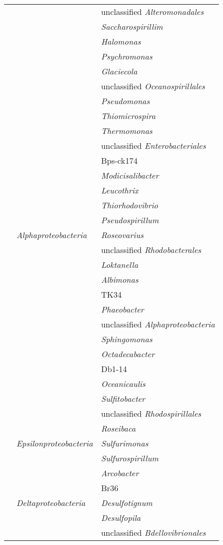 \begin{longtable}{p{2.5cm}p{4cm}p{7cm}}
 &  & unclassified \emph{Alteromonadales} \\
 &  & \emph{Saccharospirillim} \\
 &  & \emph{Halomonas} \\
 &  & \emph{Psychromonas} \\
 &  & \emph{Glaciecola} \\
 &  & unclassified \emph{Oceanospirillales} \\
 &  & \emph{Pseudomonas} \\
 &  & \emph{Thiomicrospira} \\
 &  & \emph{Thermomonas} \\
 &  & unclassified \emph{Enterobacteriales} \\
 &  & Bps-ck174  \\
 &  & \emph{Modicisalibacter} \\
 &  & \emph{Leucothrix} \\
 &  & \emph{Thiorhodovibrio} \\
 &  & \emph{Pseudospirillum} \\
 & \emph{Alphaproteobacteria}  & \emph{Roseovarius} \\
 &  & unclassified \emph{Rhodobacterales} \\
 &  & \emph{Loktanella} \\
 &  & \emph{Albimonas} \\
 &  & TK34  \\
 &  & \emph{Phaeobacter} \\
 &  & unclassified \emph{Alphaproteobacteria} \\
 &  & \emph{Sphingomonas} \\
 &  & \emph{Octadecabacter} \\
 &  & Db1-14  \\
 &  & \emph{Oceanicaulis} \\
 &  & \emph{Sulfitobacter} \\
 &  & unclassified \emph{Rhodospirillales} \\
 &  & \emph{Roseibaca} \\
 & \emph{Epsilonproteobacteria} & \emph{Sulfurimonas} \\
 &  & \emph{Sulfurospirillum} \\
 &  & \emph{Arcobacter} \\
 &  & Br36 \\
 & \emph{Deltaproteobacteria} & \emph{Desulfotignum} \\
 &  & \emph{Desulfopila} \\
 &  & unclassified \emph{Bdellovibrionales} \\

\end{longtable}
